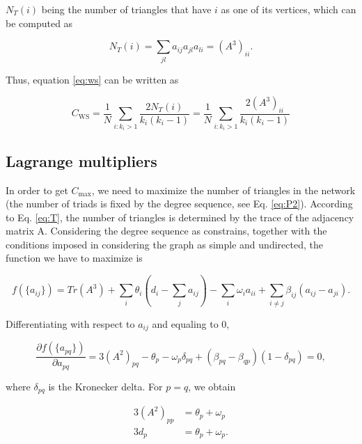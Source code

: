 \documentclass{article}
\begin{document}
$N_T(i)$ being the number of triangles that have $i$ as one of its vertices, which can be computed as

\begin{equation}
    N_T(i) = \sum_{jl} a_{ij} a_{jl} a_{li} = (A^3)_{ii}.
\end{equation}

Thus, equation \ref{eq:ws} can be written as

\begin{equation} \label{eq:CwsTheo}
    C_{\mathrm{WS}} = \dfrac{1}{N} \sum\limits_{i:k_i>1}  \dfrac{2 N_{T}(i)}{k_i (k_i-1)} =  \dfrac{1}{N} \sum\limits_{i:k_i>1} \dfrac{2 (A^3)_{ii}}{k_i (k_i-1)} 
\end{equation}


\subsection{Lagrange multipliers}

In order to get $C_{\mathrm{max}}$, we need to maximize the number of triangles in the network (the number of triads is fixed by the degree sequence, see Eq. \ref{eq:P2}). According to Eq. \ref{eq:T}, the number of triangles is determined by the trace of the adjacency matrix A. Considering the degree sequence as constrains, together with the conditions imposed in considering the graph as simple and undirected, the function we have to maximize is

\begin{equation}
    f(\lbrace a_{ij} \rbrace) = Tr(A^3) + \sum_i \theta_i \left(d_i - \sum_j a_{ij} \right) - \sum_i \omega_i a_{ii} + \sum_{i\neq j} \beta_{ij} (a_{ij}-a_{ji}).
\end{equation}

Differentiating with respect to $a_{ij}$ and equaling to 0,

\begin{equation}
    \dfrac{\partial f(\lbrace a_{pq} \rbrace)}{\partial a_{pq}} = 3 (A^2)_{pq} - \theta_p - \omega_p \delta_{pq} + (\beta_{pq} - \beta_{qp}) (1-\delta_{pq}) = 0,
\end{equation}

where $\delta_{pq}$ is the Kronecker delta. For $p=q$, we obtain

\begin{align}
    3 (A^2)_{pp} &= \theta_p + \omega_p \\
    3 d_p &=  \theta_p + \omega_p.
\end{align}
\end{document}
